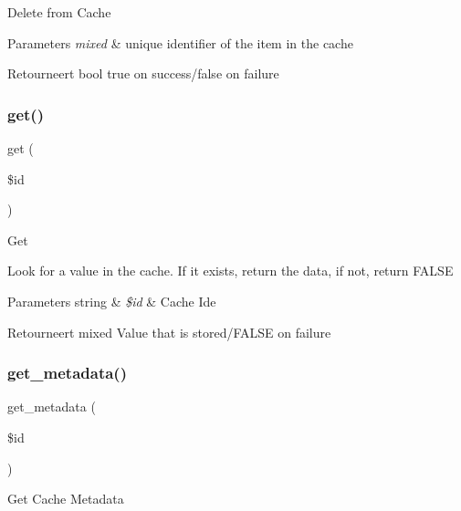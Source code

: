 Delete from Cache


\begin{DoxyParams}{Parameters}
{\em mixed} & unique identifier of the item in the cache \\
\hline
\end{DoxyParams}
\begin{DoxyReturn}{Retourneert}
bool true on success/false on failure 
\end{DoxyReturn}
\mbox{\label{class_c_i___cache__wincache_a50e3bfb586b2f42932a6a93f3fbb0828}} 
\subsubsection{\texorpdfstring{get()}{get()}}
{\footnotesize\ttfamily get (\begin{DoxyParamCaption}\item[{}]{\$id }\end{DoxyParamCaption})}

Get

Look for a value in the cache. If it exists, return the data, if not, return F\+A\+L\+SE


\begin{DoxyParams}[1]{Parameters}
string & {\em \$id} & Cache Ide \\
\hline
\end{DoxyParams}
\begin{DoxyReturn}{Retourneert}
mixed Value that is stored/\+F\+A\+L\+SE on failure 
\end{DoxyReturn}
\mbox{\label{class_c_i___cache__wincache_a59635cf18e997c5141bffa05ff7622e0}} 
\subsubsection{\texorpdfstring{get\_metadata()}{get\_metadata()}}
{\footnotesize\ttfamily get\+\_\+metadata (\begin{DoxyParamCaption}\item[{}]{\$id }\end{DoxyParamCaption})}

Get Cache Metadata


